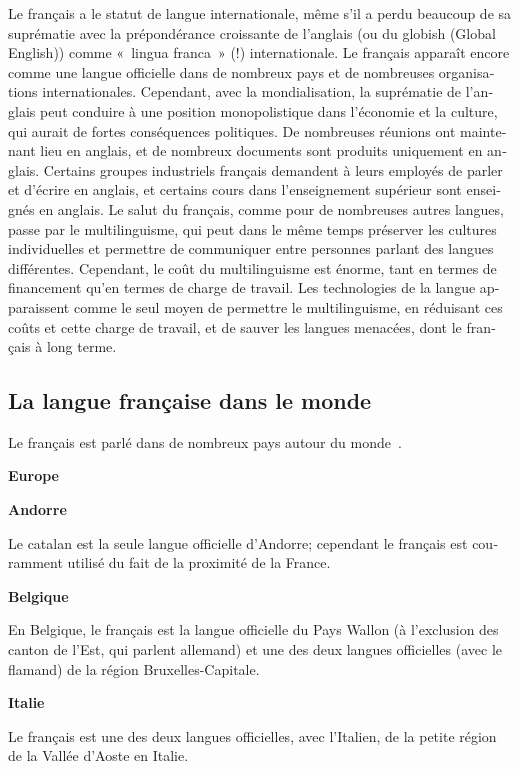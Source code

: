 \begin{french}
\begin{multicols}{2}
Le français a le statut de langue internationale, même s'il a
perdu beaucoup de sa suprématie avec la prépondérance croissante de
l'anglais (ou du globish (Global English)) comme «~lingua franca~» (!)
internationale. Le français apparaît encore comme une langue
officielle dans de nombreux pays et de nombreuses organisations
internationales. Cependant, avec la mondialisation, la suprématie de
l'anglais peut conduire à une position monopolistique dans
l'économie et la culture, qui aurait de fortes conséquences
politiques. De nombreuses réunions ont maintenant lieu en anglais, et
de nombreux documents sont produits uniquement en anglais. Certains
groupes industriels français demandent à leurs employés de parler 
et d'écrire en anglais, et certains cours dans l'enseignement supérieur sont enseignés en anglais. Le salut du
français, comme pour de nombreuses autres langues, passe par le
multilinguisme, qui peut dans le même temps préserver les cultures
individuelles et permettre de communiquer entre personnes parlant
des langues différentes. Cependant, le coût du multilinguisme est
énorme, tant en termes de financement qu'en termes de charge
de travail. Les technologies de la langue apparaissent comme le seul
moyen de permettre le multilinguisme, en réduisant ces coûts et cette 
charge de travail, et de sauver les langues menacées, dont le français
à long terme.

\subsection{La langue française dans le monde}
\label{frenchInTheWorld}
Le français est parlé dans de nombreux pays autour du
monde~\cite{francais}.

\begin{center}
{\bf {\sc Europe}}
\end{center}

{\bf Andorre}

Le catalan est la seule langue officielle d'Andorre; cependant
le français est couramment utilisé du fait de la proximité de la
France.

{\bf Belgique}

En Belgique, le français est la langue officielle du Pays Wallon (à
l'exclusion des canton de l'Est, qui parlent allemand)
et une des deux langues officielles (avec le flamand) de la région
Bruxelles-Capitale.

{\bf Italie}

Le français est une des deux langues officielles, avec l'Italien, de la petite région de la Vallée d'Aoste en
Italie.


\end{multicols}
\end{french}
